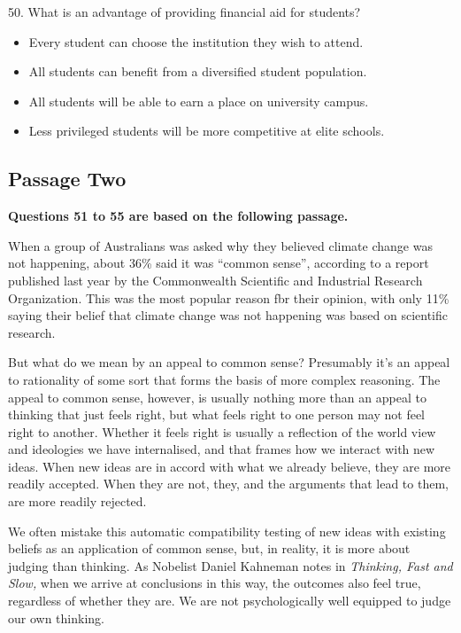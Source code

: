 \documentclass[UTF8,11pt]{ctexart}
\begin{document}
50. What is an advantage of providing financial aid for students?


\begin{itemize}[leftmargin=2em,itemsep=.2em,topsep=.4em]\item[A.] Every student can choose the institution they wish to attend.
\item[B.] All students can benefit from a diversified student population.
\item[C.] All students will be able to earn a place on university campus.
\item[D.] Less privileged students will be more competitive at elite schools.
\end{itemize}

\subsection*{\textbf{Passage Two}}


\textbf{Questions 51 to 55 are based on the following passage.}


When a group of Australians was asked why they believed climate change was not happening, about 36\% said it was “common sense”, according to a report published last year by the Commonwealth Scientific and Industrial Research Organization. This was the most popular reason fbr their opinion, with only 11\% saying their belief that climate change was not happening was based on scientific research.


But what do we mean by an appeal to common sense? Presumably it's an appeal to rationality of some sort that forms the basis of more complex reasoning. The appeal to common sense, however, is usually nothing more than an appeal to thinking that just feels right, but what feels right to one person may not feel right to another. Whether it feels right is usually a reflection of the world view and ideologies we have internalised, and that frames how we interact with new ideas. When new ideas are in accord with what we already believe, they are more readily accepted. When they are not, they, and the arguments that lead to them, are more readily rejected.


We often mistake this automatic compatibility testing of new ideas with existing beliefs as an application of common sense, but, in reality, it is more about judging than thinking. As Nobelist Daniel Kahneman notes in \textit{Thinking, Fast and Slow,} when we arrive at conclusions in this way, the outcomes also feel true, regardless of whether they are. We are not psychologically well equipped to judge our own thinking.
\end{document}
